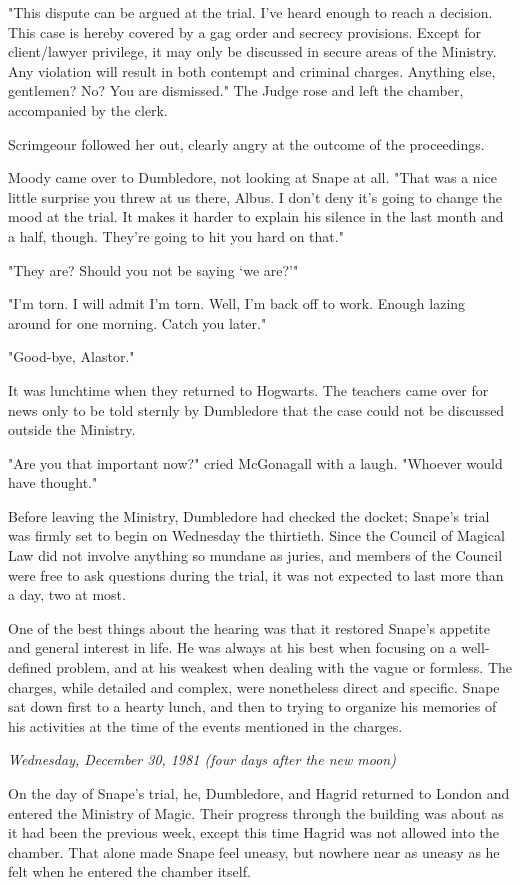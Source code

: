 \documentclass[a4paper,11pt]{article}
\begin{document}
"This dispute can be argued at the trial. I've heard enough to reach a decision. This case is hereby covered by a gag order and secrecy provisions. Except for client/lawyer privilege, it may only be discussed in secure areas of the Ministry. Any violation will result in both contempt and criminal charges. Anything else, gentlemen? No? You are dismissed." The Judge rose and left the chamber, accompanied by the clerk.

Scrimgeour followed her out, clearly angry at the outcome of the proceedings.

Moody came over to Dumbledore, not looking at Snape at all. "That was a nice little surprise you threw at us there, Albus. I don't deny it's going to change the mood at the trial. It makes it harder to explain his silence in the last month and a half, though. They're going to hit you hard on that."

"They are? Should you not be saying `we are?'"

"I'm torn. I will admit I'm torn. Well, I'm back off to work. Enough lazing around for one morning. Catch you later."

"Good-bye, Alastor."

It was lunchtime when they returned to Hogwarts. The teachers came over for news only to be told sternly by Dumbledore that the case could not be discussed outside the Ministry.

"Are you that important now?" cried McGonagall with a laugh. "Whoever would have thought."

Before leaving the Ministry, Dumbledore had checked the docket; Snape's trial was firmly set to begin on Wednesday the thirtieth. Since the Council of Magical Law did not involve anything so mundane as juries, and members of the Council were free to ask questions during the trial, it was not expected to last more than a day, two at most.

One of the best things about the hearing was that it restored Snape's appetite and general interest in life. He was always at his best when focusing on a well-defined problem, and at his weakest when dealing with the vague or formless. The charges, while detailed and complex, were nonetheless direct and specific. Snape sat down first to a hearty lunch, and then to trying to organize his memories of his activities at the time of the events mentioned in the charges.

\emph{Wednesday, December 30, 1981 (four days after the new moon)}

On the day of Snape's trial, he, Dumbledore, and Hagrid returned to London and entered the Ministry of Magic. Their progress through the building was about as it had been the previous week, except this time Hagrid was not allowed into the chamber. That alone made Snape feel uneasy, but nowhere near as uneasy as he felt when he entered the chamber itself.
\end{document}
